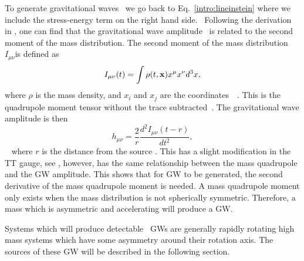 To generate gravitational waves~ we go back to Eq.~\ref{intro:lineinstein}
where we include the stress-energy term on the right hand side.~
Following the derivation in \citep{flanagan2005BasicsGravitational}, one can
find that the gravitational wave amplitude~ is related to the second moment of the mass
distribution.  The second moment of the mass distribution~ $I_{\mu\nu}$is defined as
\begin{equation}
    I_{\mu \nu}(t) = \int \rho(t,{\bf x}) x^\mu x^\nu d^3x,
\end{equation}
where $\rho$ is the mass density, and $x_i$ and $x_j$ are the
coordinates~~\citep{flanagan2005BasicsGravitational}.  This is the quadrupole
moment tensor without the trace subtracted~. The gravitational wave amplitude is then
\begin{equation}
\label{intro:gravwave:amp}
    h_{\mu \nu} = \frac{2}{r}  \frac{d^2 I_{\mu \nu}(t-r)}{dt^2},
\end{equation}
~ where $r$ is the
distance from the source \citep{letiec2016TheoryGravitational}.  This has a
slight modification in the TT gauge, see
\citep{flanagan2005BasicsGravitational}, however, has the same relationship
between the mass quadrupole and the \gls{GW} amplitude.  This shows that for
\gls{GW} to be generated, the second derivative of the mass quadrupole moment
is needed.  A mass quadrupole moment only exists when the mass distribution is
not spherically symmetric.  Therefore, a mass which is asymmetric and
accelerating will produce a \gls{GW}.~

Systems which will produce detectable~
\glspl{GW} are generally rapidly rotating high~ mass systems which have some
asymmetry around their rotation axis.  The sources of these \gls{GW} will be
described in the following section.~



